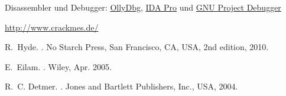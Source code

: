 \begin{thebibliography}{9}
 Disassembler und Debugger:
    \href{http://www.ollydbg.de/}{OllyDbg},
    \href{http://www.hex-rays.com/idapro/}{IDA Pro} und
    \href{http://www.gnu.org/software/gdb/}{GNU Project Debugger}

    \url{http://www.crackmes.de/}


R.~Hyde.
.
\newblock No Starch Press, San Francisco, CA, USA, 2nd edition, 2010.

E.~Eilam.
.
\newblock Wiley, Apr. 2005.

R.~C. Detmer.
.
\newblock Jones and Bartlett Publishers, Inc., USA, 2004.


\end{thebibliography}
